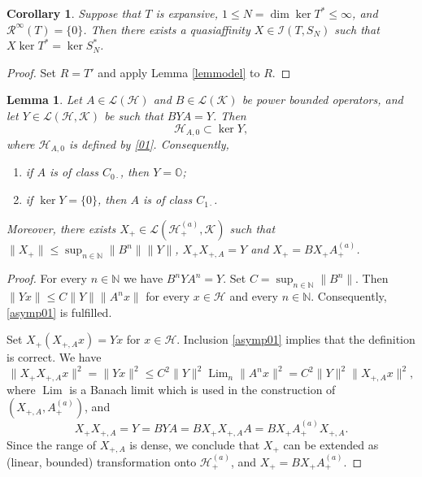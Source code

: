 \documentclass[a4paper,oneside,11pt]{amsart}
\numberwithin{equation}{section}
\theoremstyle{plain}
\newtheorem{lemma}[theorem]{Lemma}
\newtheorem{corollary}[theorem]{Corollary}
\theoremstyle{definition}
\begin{document}
 
 \begin{corollary}\label{cormodel} Suppose that $T$ is  expansive, $1\leq N=\dim\ker T^*\leq \infty$, 
and $\mathcal R^\infty(T)=\{0\}$. Then there exists a quasiaffinity $X\in\mathcal I(T,S_N)$ such that  $X\ker T^*=\ker S_N^*$.
\end{corollary}
\begin{proof} Set $R=T'$ and apply Lemma \ref{lemmodel} to $R$.\end{proof}




\begin{lemma}\label{lemyy} Let $A\in\mathcal L(\mathcal H)$ and  $B\in\mathcal L(\mathcal K)$ be power bounded operators, and let $Y\in\mathcal L(\mathcal H,\mathcal K)$ be 
such that $BYA=Y$. Then 
 \begin{equation}\label{asymp01} \mathcal H_{A,0}\subset\ker Y, \end{equation}
where $\mathcal H_{A,0}$ is defined by \eqref{01}. Consequently, 
\begin{enumerate}[\upshape (i)]
\item if $A$ is of class $C_{0\cdot}$, then $Y=\mathbb O$;
\item if $\ker Y=\{0\}$, then $A$ is of class $C_{1\cdot}$.
\end{enumerate}
Moreover, 
there exists $X_+\in\mathcal L(\mathcal H_+^{(a)},\mathcal K)$  such that
$\|X_+\|\leq\sup_{n\in\mathbb N}\|B^n\|\|Y\|$, 
$X_+X_{+,A}=Y$ and $X_+=BX_+A_+^{(a)}$.
\end{lemma}
\begin{proof} For every $n\in\mathbb N$ we have $B^nYA^n=Y$. Set $C=\sup_{n\in\mathbb N}\|B^n\|$.
 Then $\|Yx\|\leq C\|Y\|\|A^nx\|$ for every $x\in\mathcal H$ and every $n\in\mathbb N$. Consequently, \eqref{asymp01} is fulfilled. 
 
Set $X_+(X_{+,A}x)=Yx$ for $x\in\mathcal H$. Inclusion \eqref{asymp01} implies that the definition is correct.    We have
\begin{equation*} \|X_+X_{+,A}x\|^2= \|Yx\|^2\leq C^2\|Y\|^2\mathop{\mathrm{Lim}}_n\|A^nx\|^2=C^2\|Y\|^2\|X_{+,A}x\|^2,  \end{equation*}
where $\mathop{\mathrm{Lim}}$ is a Banach limit which is used in the construction of $(X_{+,A},A_+^{(a)})$, 
and
\begin{equation*}X_+X_{+,A}=Y=BYA=BX_+X_{+,A}A=BX_+A_+^{(a)}X_{+,A}.
\end{equation*}
Since the range of $X_{+,A}$ is dense, we conclude that 
$X_+$ can be extended as (linear, bounded) transformation onto $\mathcal H_+^{(a)}$, and $X_+=BX_+A_+^{(a)}$. 
\end{proof}
\end{document}
